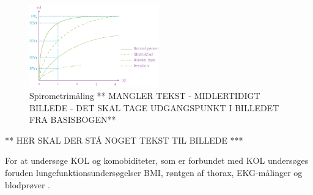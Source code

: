 \begin{figure} [H]
\centering
\includegraphics[width=0.5\textwidth]{figures/FEV}
\caption{Spirometrimåling ** MANGLER TEKST - MIDLERTIDIGT BILLEDE - DET SKAL TAGE UDGANGSPUNKT I BILLEDET FRA BASISBOGEN**}
\label{fig:FEV}
\end{figure} 

\noindent
** HER SKAL DER STÅ NOGET TEKST TIL BILLEDE ***

For at undersøge KOL og komobiditeter, som er forbundet med KOL undersøges foruden lungefunktionsundersøgelser BMI, røntgen af thorax, EKG-målinger og blodprøver \cite{Sundhed2013}. 
